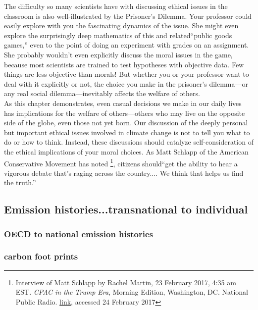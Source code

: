The difficulty so many scientists have with discussing ethical issues in the classroom is also well-illustrated by the Prisoner's Dilemma. Your professor could easily explore with you the fascinating dynamics of the issue. She might even explore the surprisingly deep mathematics of this and related``public goods games,'' even to the point of doing an experiment with grades on an assignment. She probably wouldn't even explicitly discuss the moral issues in the game, because most scientists are trained to test hypotheses with objective data. Few things are less objective than morals! But whether you or your professor want to deal with it explicitly or not, the choice you make in the prisoner's dilemma---or any real social dilemma---inevitably affects the welfare of others.\\

As this chapter demonstrates, even casual decisions we make in our daily lives has implications for the welfare of others---others who may live on the opposite side of the globe, even those not yet born. Our discussion of the deeply personal but important ethical issues involved in climate change is not to tell you what to do or how to think. Instead, these discussions should catalyze self-consideration of the ethical implications of your moral choices. As Matt Schlapp of the American Conservative Movement has noted \footnote{Interview of Matt Schlapp by Rachel Martin, 23 February 2017, 4:35 am EST. \textit{CPAC in the Trump Era}, Morning Edition, Washington, DC. National Public Radio. \href{http://www.npr.org/2017/02/23/516787809/cpac-in-the-trump-era}{link}, accessed 24 February 2017}, citizens should``get the ability to hear a vigorous debate that's raging across the country.... We think that helps us find the truth.''  \\

\subsection{Emission histories...transnational to individual}
\subsubsection{OECD to national emission histories}
\subsubsection{carbon foot prints}

